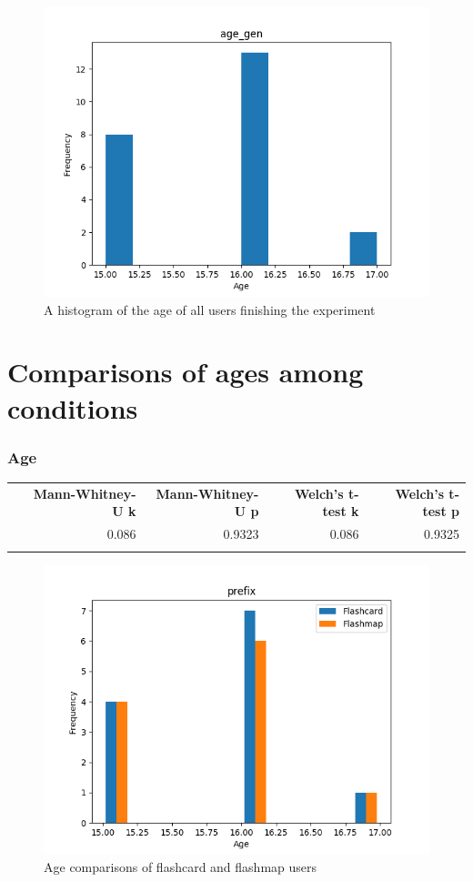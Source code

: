 \begin{figure}[htbp]
    \centering
    \includegraphics{img/age_gen.png}
    \caption{A histogram of the age of all users finishing the experiment}
\end{figure}

\FloatBarrier
\section{Comparisons of ages among conditions}

\FloatBarrier
\subsubsection{Age}

\begin{longtable}[c]{@{}lrrrr@{}}
\toprule\addlinespace
& \textbf{Mann-Whitney-U k} & \textbf{Mann-Whitney-U p} &
\textbf{Welch's t-test k} & \textbf{Welch's t-test p}
\\\addlinespace
\midrule\endhead
& 0.086 & 0.9323 & 0.086 & 0.9325
\\\addlinespace
\bottomrule
    \label{tab:age_comp}
\end{longtable}

\begin{figure}[htbp]
    \centering
    \includegraphics{img/age.png}
    \caption{Age comparisons of flashcard and flashmap users}
\end{figure}
